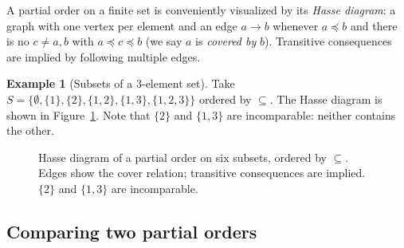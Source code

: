 \documentclass[11pt,a4paper]{article}
\theoremstyle{definition}
\newtheorem{example}[definition]{Example}
\theoremstyle{plain}
\theoremstyle{remark}
\begin{document}
A partial order on a finite set is conveniently visualized by its
\emph{Hasse diagram}: a graph with one vertex per element and an edge
$a \to b$ whenever $a \preceq b$ and there is no $c \ne a,b$ with
$a \preceq c \preceq b$ (we say $a$ is \emph{covered by} $b$).
Transitive consequences are implied by following multiple edges.

\begin{example}[Subsets of a $3$-element set]
Take $S = \{\emptyset, \{1\}, \{2\}, \{1,2\}, \{1,3\}, \{1,2,3\}\}$
ordered by $\subseteq$.  The Hasse diagram is shown in
Figure~\ref{fig:hasse-subset}.  Note that $\{2\}$ and $\{1,3\}$ are
incomparable: neither contains the other.
\end{example}

\begin{figure}[h]
\centering
{}
\caption{Hasse diagram of a partial order on six subsets, ordered by
$\subseteq$.  Edges show the cover relation; transitive consequences
are implied.  $\{2\}$ and $\{1,3\}$ are incomparable.}
\label{fig:hasse-subset}
\end{figure}

\subsection{Comparing two partial orders}\label{ssec:kendall}
\end{document}
